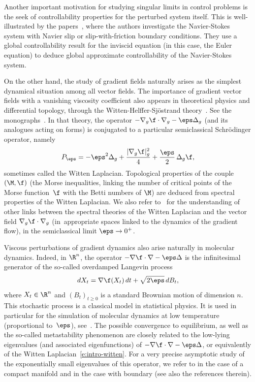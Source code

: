 Another important motivation for studying singular limits in control problems is the seek of controllability properties for the perturbed system itself. This is well-illustrated by the papers~\cite{Cor:96,CF:96,ChaNavier:09,CMS:19}, where the authors investigate the Navier-Stokes system with Navier slip or slip-with-friction boundary conditions. They use a global controllability result for the inviscid equation (in this case, the Euler equation) to deduce global approximate controllability of the Navier-Stokes system.

On the other hand, the study of gradient fields naturally arises as the simplest dynamical situation among all vector fields.
The importance of gradient vector fields with a vanishing viscosity coefficient also appears in theoretical physics and differential topology, through the Witten-Helffer-Sjöstrand theory~\cite{Witten:82,HS:85}. See \eg the monographs~\cite{Helffer:booksemiclassic,CFKS}.
In that theory, the operator $- \nabla_g \f \cdot \nabla_g - \eps \Delta_g$ (and its analogues acting on forms) is conjugated to a particular semiclassical Schrödinger operator, namely
\begin{equation}
\label{e:intro-witten}
P_\eps = -\eps^2 \Delta_g + \frac{|\nabla_g \f|_g^2}{4} + \frac{\eps}{2}\, \Delta_g \f,
\end{equation}
sometimes called the Witten Laplacian.
Topological properties of the couple $(\M,\f)$ (\eg the Morse inequalities, linking the number of critical points of the Morse function~$\f$ with the Betti numbers of $\M$) are deduced from spectral properties of the Witten Laplacian.
We also refer to~\cite{DR:20} for the understanding of other links between the spectral theories of the Witten Laplacian and the vector field $\nabla_g \f \cdot \nabla_g$ (in~appropriate spaces linked to the dynamics of the gradient flow), in the semiclassical limit $\eps\to 0^+$.

Viscous perturbations of gradient dynamics also arise naturally in molecular dynamics.
Indeed, in $\R^n$, the operator $- \nabla \f \cdot \nabla - \eps \Delta$ is the infinitesimal generator of the so-called overdamped Langevin process
\[
dX_t = \nabla \f(X_t)\, dt + \sqrt{2\eps}\, dB_t,
\]
where $X_t\in \R^n$ and $(B_t)_{t\geq0}$ is a standard Brownian motion of dimension $n$. This stochastic process is a classical model in statistical physics. It is used in particular for the simulation of molecular dynamics at low temperature (proportional to~$\eps$), see~\cite{Chan:43,SM:79}. The possible convergence to equilibrium, as well as the so-called metastability phenomenon are closely related to the low-lying eigenvalues (and associated eigenfunctions) of $- \nabla \f \cdot \nabla - \eps \Delta$, or equivalently of the Witten Laplacian~\eqref{e:intro-witten}.
For a very precise asymptotic study of the exponentially small eigenvalues of this operator, we refer \eg to \cite{HKN:04,Michel:19} in the case of a compact manifold and \cite{HN:06,LePeutrec:10,DLLN:19} in the case with boundary (see also the references therein).

